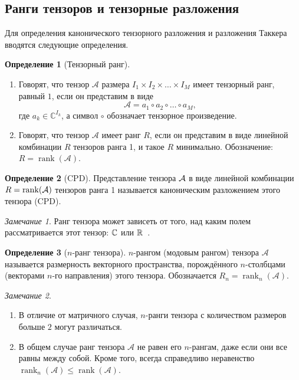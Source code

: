 \documentclass[specialist,
  substylefile=spbu_report.rtx,
subf,href,colorlinks=true, 12pt]{disser}
\theoremstyle{plain}
\theoremstyle{definition}
\newtheorem{definition}{Определение}[section]
\theoremstyle{remark}
\newtheorem{remark}{Замечание}[section]
\begin{document}
\subsection{Ранги тензоров и тензорные разложения}\label{subsec:tensor-ranks}
Для определения канонического тензорного разложения и разложения
Таккера вводятся следующие определения.
\begin{definition}[Тензорный ранг]
  \leavevmode
  \begin{enumerate}
    \item Говорят, что тензор $\mathcal{A}$ размера $I_1\times
      I_2\times \ldots \times I_M$ имеет тензорный ранг, равный $1$,
      если он представим в виде
      \[
        \mathcal{A}=a_1\circ a_2\circ \ldots \circ a_M,
      \]
      где $a_{k} \in \mathbb{C}^{I_k}$, а символ $\circ$ обозначает
      тензорное произведение.
    \item Говорят, что тензор $\mathcal{A}$ имеет ранг $R$, если он
      представим в виде линейной комбинации $R$ тензоров
      ранга 1, и такое $R$ минимально.
      Обозначение: $R=\operatorname{rank}(\mathcal{A})$.
  \end{enumerate}
\end{definition}
\begin{definition}[CPD]
  Представление тензора $\mathcal{A}$ в виде линейной комбинации
  $R = \operatorname{rank}(\mathcal{A})$ тензоров ранга 1 называется
  каноническим разложением этого тензора (CPD).
\end{definition}

\begin{remark}
  Ранг тензора может зависеть от того, над каким полем
  рассматривается этот тензор:
  $\mathbb{C}$ или $\mathbb{R}$~\cite{tensor-bg}.
\end{remark}

\begin{definition}[$n$-ранг тензора]
  $n$-рангом (модовым рангом) тензора $\mathcal{A}$ называется
  размерность векторного пространства, порождённого
  $n$-столбцами (векторами $n$-го направления) этого тензора.
  Обозначается $R_n=\operatorname{rank}_{n}(\mathcal{A})$.
\end{definition}

\begin{remark}
  \begin{enumerate}
    \item В отличие от матричного случая, $n$-ранги тензора с
      количеством размеров больше $2$ могут различаться.
    \item В общем случае ранг тензора $\mathcal{A}$ не равен его
      $n$-рангам, даже если они все равны между
      собой.
      Кроме того, всегда справедливо неравенство
      $\operatorname{rank}_n(\mathcal{A})\leqslant
      \operatorname{rank}(\mathcal{A})$.
  \end{enumerate}
\end{remark}
\end{document}
